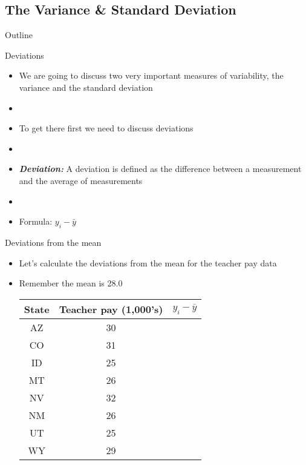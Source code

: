 \documentclass[xcolor=dvipsnames]{beamer}
\begin{document}
\subsection{The Variance \& Standard Deviation}
\begin{frame}{Outline}
	\tableofcontents[currentsection,subsectionstyle=show/shaded/hide]
\end{frame}

\begin{frame}{Deviations}
	\begin{itemize}
		\item We are going to discuss two very important measures of variability, the variance and the standard deviation \pause
		\item[]
		\item To get there first we need to discuss deviations \pause
		\item[]
		\item \textbf{\emph{Deviation:}} A deviation is defined as the difference between a measurement and the average of measurements
		\item[]
		\item Formula: $y_i - \bar{y}$
	\end{itemize}
\end{frame}

\begin{frame}{Deviations from the mean}
	\begin{itemize}
		\item Let's calculate the deviations from the mean for the teacher pay data \pause
		\item Remember the mean is 28.0
			\begin{center}
			\begin{tabular}{|c|c|c|}
				\hline 
				\textbf{State} & \textbf{Teacher pay (1,000's)} &  $y_i - \bar{y}$ \\ 
				\hline \hline
				AZ & 30 &\\ \hline 
				CO &  31 &\\ \hline 
				ID & 25  &\\  \hline 
				MT &  26 &\\ \hline 
				NV & 32 &\\ \hline 
				NM &  26 &\\ \hline 
				UT &  25 &\\ \hline 
				WY &  29 &\\ \hline 
			\end{tabular} 
		\end{center}
	\end{itemize}
\end{frame}
\end{document}
